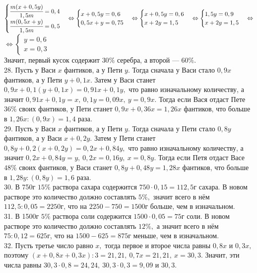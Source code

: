 \documentclass[12pt]{article}
\begin{document}
$\begin{cases}
\cfrac{m(x+0,5y)}{1,5m}=0,4\\
\cfrac{m(0,5x+y)}{1,5m}=0,5
\end{cases}
\Leftrightarrow
\begin{cases}
x+0,5y=0,6\\
0,5x+y=0,75
\end{cases}
\Leftrightarrow
\begin{cases}
x+0,5y=0,6\\
x+2y=1,5
\end{cases}
\Leftrightarrow
\begin{cases}
1,5y=0,9\\
x+2y=1,5
\end{cases}
\Leftrightarrow$\\$\Leftrightarrow
\begin{cases}
y=0,6\\
x=0,3
\end{cases}
$\\
Значит, первый кусок содержит $30\%$ серебра, а второй --- $60\%.$\\
28. Пусть у Васи $x$ фантиков, а у Пети $y.$ Тогда сначала у Васи стало $0,9x$ фантиков, а у Пети $y+0,1x.$ Затем у Васи станет $0,9x+0,1(y+0,1x)=0,91x+0,1y,$ что равно изначальному количеству, а значит $0,91x+0,1y=x,\ 0,1y=0,09x,\ y=0,9x.$ Тогда если Вася отдаст Пете $36\%$ своих фантиков, у Пети станет $0,9x+0,36x=1,26x$ фантиков, что больше в $1,26x:(0,9x)=1,4$ раза.\\
29. Пусть у Васи $x$ фантиков, а у Пети $y.$ Тогда сначала у Пети стало $0,8y$ фантиков, а у Васи $x+0,2y.$ Затем у Пети станет $0,8y+0,2(x+0,2y)=0,2x+0,84y,$ что равно изначальному количеству, а значит $0,2x+0,84y=y,\ 0,2x=0,16y,\ x=0,8y.$ Тогда если Петя отдаст Васе $48\%$ своих фантиков, у Васи станет $0,8y+0,48y=1,28x$ фантиков, что больше в $1,28y:(0,8y)=1,6$ раза.\\
30. В 750г $15\%$ раствора сахара содержится $750\cdot0,15=112,5$г сахара. В новом растворе это количество должно составлять $5\%,$ значит всего в нём $112,5:0,05=2250$г, что на $2250-750=1500$г больше, чем в изначальном.\\
31. В 1500г $5\%$ раствора соли содержится $1500\cdot0,05=75$г соли. В новом растворе это количество должно составлять $12\%,$ а значит всего в нём $75:0,12=625$г, что на $1500-625=875$г меньше, чем в изначальном.\\
32. Пусть третье число равно $x,$ тогда первое и второе числа равны $0,8x$ и $0,3x,$ поэтому $(x+0,8x+0,3x):3=21,21,\ 0,7x=21,21,\ x=30,3.$ Значит, эти числа равны $30,3\cdot0,8=24,24,\ 30,3\cdot0,3=9,09$ и $30,3.$\\
\end{document}
